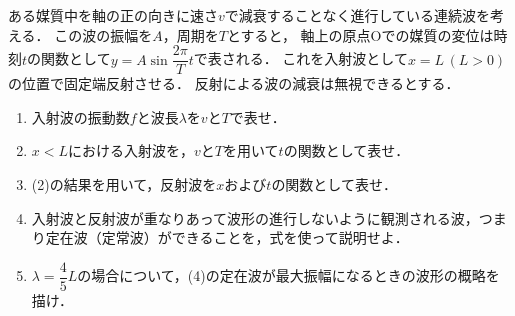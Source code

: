 ある媒質中を\x 軸の正の向きに速さ$v$で減衰することなく進行している連続波を考える．
この波の振幅を$A$，周期を$T$とすると，
\x 軸上の原点Oでの媒質の変位は時刻$t$の関数として$y=A\sin\dfrac{2\pi}{T}t$で表される．
これを入射波として$x=L\,(L>0)$の位置で固定端反射させる．
反射による波の減衰は無視できるとする．

\begin{enumerate}[（1）]
  \setlength{\leftskip}{-1.5zw}
  \setlength{\itemindent}{1zw}\setlength{\labelsep}{0.5zw}
  \setlength{\labelwidth}{1zw}\setlength{\leftmargin}{1zw}
  \setlength{\itemsep}{0.5\baselineskip}
  \item 入射波の振動数$f$と波長$\lambda$を$v$と$T$で表せ．
  \item $x<L$における入射波を，$v$と$T$を用いて$t$の関数として表せ．
  \item (2)の結果を用いて，反射波を$x$および$t$の関数として表せ．
  \item 入射波と反射波が重なりあって波形の進行しないように観測される波，つまり定在波（定常波）ができることを，式を使って説明せよ．
  \item $\lambda=\dfrac{4}{5}L$の場合について，(4)の定在波が最大振幅になるときの波形の概略を描け．
\end{enumerate}



\begin{comment}

\end{comment}


